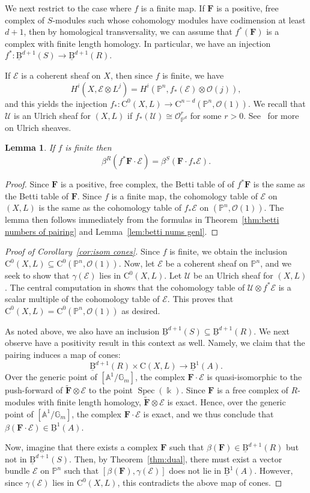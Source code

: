 \documentclass[12pt]{amsart}
\newtheorem{lemma}{Lemma}[section]
\theoremstyle{definition}
\theoremstyle{remark}
\newcommand{\Spec}{\operatorname{Spec}}
\newcommand{\kk}{\Bbbk}
\newcommand{\PP}{\mathbb{P}}
\renewcommand{\AA}{\mathbb{A}}
\newcommand{\GG}{\mathbb{G}}
\newcommand{\cO}{\mathcal{O}}
\newcommand{\cE}{\mathcal{E}}
\newcommand{\cU}{\mathcal{U}}
\newcommand{\FF}{\mathbf{F}}
\newcommand{\CQ}{\mathrm{C}}
\newcommand{\BBQ}{\underline{\mathrm{B}}}
\begin{document}
We next restrict to the case where $f$ is a finite map. If $\FF$ is a positive, free complex of $S$-modules such whose cohomology modules have codimension at least $d+1$, then by homological transversality, we can assume that $f^*(\FF)$ is a complex with finite length homology.  In particular, we have an injection $f^*\colon \BBQ^{d+1}(S)\to \BBQ^{d+1}(R)$.

If $\cE$ is a coherent sheaf on $X$, then since $f$ is finite, we have
\[
H^i(X,\cE\otimes L^j)=H^i(\PP^n, f_*(\cE)\otimes \cO(j)),
\]
and this yields the injection $f_*\colon \CQ^0(X,L)\to \CQ^{n-d}(\PP^n,\cO(1))$.
We recall that $\cU$ is an Ulrich sheaf for $(X,L)$ if $f_*(\cU)\cong \cO_{\PP^d}^r$ for some $r>0$.  See~\cite{XXXX} for more on Ulrich sheaves.

\begin{lemma}\label{lem:general pairing}
If $f$ is finite then
\[
\beta^R(f^*\FF\cdot \cE)=\beta^S(\FF\cdot f_*\cE).
\]
\end{lemma}
\begin{proof}
Since $\FF$ is a positive, free complex, the Betti table of of $f^*\FF$ is the same as the Betti table of $\FF$.  Since $f$ is a finite map, the cohomology table of $\cE$ on $(X,L)$ is the same as the cohomology table of $f_*\cE$ on $(\PP^n, \cO(1))$.  The lemma then follows immediately from the formulas in Theorem~\ref{thm:betti numbers of pairing} and Lemma~\ref{lem:betti nums genl}.
\end{proof}

\begin{proof}[Proof of Corollary~\ref{cor:isom cones}]
Since $f$ is finite, we obtain the inclusion $\CQ^0(X,L)\subseteq \CQ^0(\PP^n,\cO(1))$.  Now, let $\cE$ be a coherent sheaf on $\PP^n$, and we seek to show that $\gamma(\cE)$ lies in $\CQ^0(X,L)$.  Let $\cU$ be an Ulrich sheaf for $(X,L)$.  The central computation in \cite[Proof of Theorem 5]{eis-schrey-abel} shows that the cohomology table of $\cU\otimes f^*\cE$ is a scalar multiple of the cohomology table of $\cE$. This proves that $\CQ^0(X,L)= \CQ^0(\PP^n,\cO(1))$ as desired.

As noted above, we also have an inclusion $\BBQ^{d+1}(S)\subseteq \BBQ^{d+1}(R)$.  We next observe have a positivity result in this context as well.  Namely, we claim that the pairing induces a map of cones:
\[
\BBQ^{d+1}(R)\times \CQ(X,L)\to \BBQ^1(A).
\]
Over the generic point of $[\AA^1/\GG_m]$, the complex $\FF\cdot \cE$ is quasi-isomorphic to the push-forward of $\widetilde{\FF}\otimes \cE$ to the point $\Spec(\kk)$.  Since $\FF$ is a free complex of $R$-modules with finite length homology, $\widetilde{\FF}\otimes \cE$ is exact.  Hence, over the generic point of $[\AA^1/\GG_m]$, the complex $\FF\cdot \cE$ is exact, and we thus conclude that $\beta(\FF\cdot \cE)\in \BBQ^1(A)$.

Now, imagine that  there exists a complex $\FF$ such that $\beta(\FF)\in \BBQ^{d+1}(R)$ but not in $\BBQ^{d+1}(S)$.  Then, by Theorem~\ref{thm:dual}, there must exist a vector bundle $\cE$ on $\PP^n$ such that $[\beta(\FF),\gamma(\cE)]$ does not lie in $\BBQ^1(A)$.  However, since $\gamma(\cE)$ lies in $\CQ^0(X,L)$, this contradicts the above map of cones.
\end{proof}
\end{document}
